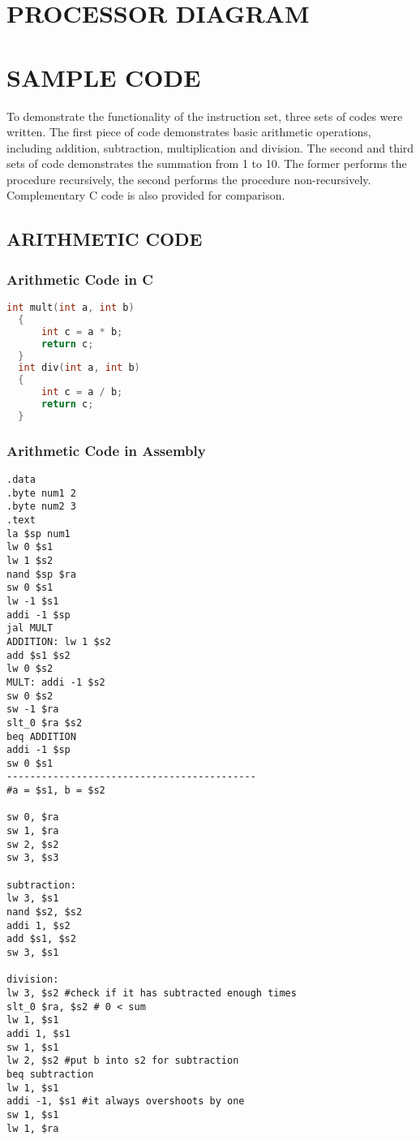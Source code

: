 \documentclass[11pt, titlepage]{article}
\begin{document}
\section{PROCESSOR DIAGRAM}

\newpage
\section{SAMPLE CODE}
To demonstrate the functionality of the instruction set, three sets of codes were written. The first piece of code demonstrates basic arithmetic operations, including addition, subtraction, multiplication and division. The second and third sets of code demonstrates the summation from 1 to 10. The former performs the procedure recursively, the second performs the procedure non-recursively. Complementary C code is also provided for comparison.  

\subsection{ARITHMETIC CODE}
\subsubsection{Arithmetic Code in C}
\begin{lstlisting}[language = C]
int mult(int a, int b)
  {
      int c = a * b;
      return c;
  }
  int div(int a, int b)
  {
      int c = a / b;
      return c;
  }
\end{lstlisting}
\subsubsection{Arithmetic Code in Assembly}
\begin{lstlisting}[language=Ant]
.data 
.byte num1 2
.byte num2 3
.text
la $sp num1
lw 0 $s1
lw 1 $s2
nand $sp $ra
sw 0 $s1
lw -1 $s1
addi -1 $sp 
jal MULT
ADDITION: lw 1 $s2  
add $s1 $s2
lw 0 $s2
MULT: addi -1 $s2
sw 0 $s2
sw -1 $ra
slt_0 $ra $s2
beq ADDITION
addi -1 $sp
sw 0 $s1
-------------------------------------------
#a = $s1, b = $s2

sw 0, $ra
sw 1, $ra
sw 2, $s2
sw 3, $s3

subtraction:
lw 3, $s1
nand $s2, $s2
addi 1, $s2
add $s1, $s2
sw 3, $s1

division:
lw 3, $s2 #check if it has subtracted enough times
slt_0 $ra, $s2 # 0 < sum
lw 1, $s1
addi 1, $s1
sw 1, $s1
lw 2, $s2 #put b into s2 for subtraction
beq subtraction
lw 1, $s1
addi -1, $s1 #it always overshoots by one
sw 1, $s1
lw 1, $ra

\end{lstlisting}
\end{document}
